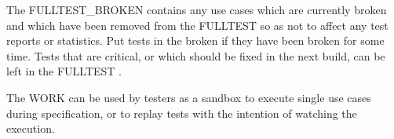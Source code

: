 The FULLTEST\_BROKEN \gdsuite{} contains any use cases which are currently broken and which have been removed from the FULLTEST so as not to affect any test reports or statistics. Put tests in the broken \gdsuite{} if they have been broken for some time. Tests that are critical, or which should be fixed in the next build, can be left in the FULLTEST \gdsuite{}. 

The WORK \gdsuites{} can be used by testers as a sandbox to execute single use cases during specification, or to replay tests with the intention of watching the execution. 
